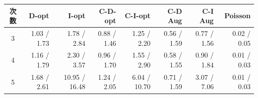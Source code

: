 
\begin{tabular}{crrrrrrr}
\toprule
次数 & D-opt & I-opt & C-D-opt & C-I-opt & C-D Aug & C-I Aug & Poisson \\
\midrule
3 & 1.03 / 1.73 & 1.78 / 2.84 & 0.88 / 1.46 & 1.25 / 2.20 & 0.56 / 1.59 & 0.77 / 1.56 & 0.02 / 0.05 \\
4 & 1.16 / 1.79 & 2.30 / 3.57 & 0.96 / 1.70 & 1.55 / 2.90 & 0.58 / 1.55 & 0.90 / 1.84 & 0.01 / 0.03 \\
5 & 1.68 / 2.61 & 10.95 / 16.48 & 1.24 / 2.05 & 6.04 / 10.70 & 0.71 / 1.59 & 3.07 / 7.06 & 0.01 / 0.03 \\
\bottomrule
\end{tabular}

